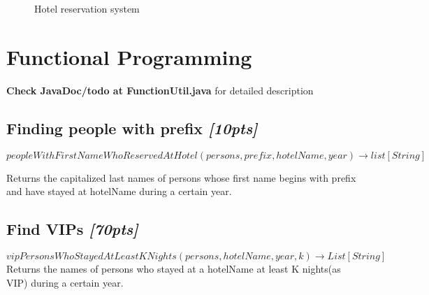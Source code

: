 \documentclass[titlepage,11pt]{article}
\begin{document}
\begin{figure}[htpb]
	\centering
	\caption{Hotel reservation system}%
	\label{fig:uml}
\end{figure}

\section{Functional Programming}
\textbf{Check JavaDoc/todo at FunctionUtil.java} for detailed description

\subsection{Finding people with prefix \emph{[10pts]}}

$$peopleWithFirstNameWhoReservedAtHotel(persons, prefix, hotelName, year)\rightarrow {list[String]}$$

Returns the capitalized last names of persons whose first name begins with prefix
and have stayed at hotelName during a certain year.

\subsection{Find VIPs \emph{[70pts]}}
$$vipPersonsWhoStayedAtLeastKNights(persons, hotelName, year, k) \rightarrow List[String]$$
Returns the names of persons who stayed at a hotelName at least K nights(as VIP) during a certain year.
\end{document}
